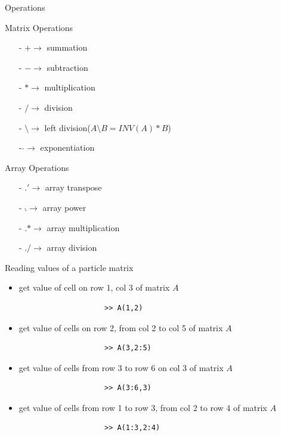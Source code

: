 \documentclass{beamer}
\begin{document}
\begin{frame}{Operations}
	\begin{block}{Matrix Operations}
		\begin{itemize}
			\item [-] $+ \rightarrow $ summation 
			\item [-] $- \rightarrow $ subtraction
			\item [-] $* \rightarrow $ multiplication
			\item [-] $/ \rightarrow $ division  
			\item [-] $\setminus \rightarrow $ left division($ A\setminus B = INV(A) * B$)
			\item [-] $\hat{} \rightarrow $ exponentiation  
		\end{itemize}
	\end{block}
	\begin{block}{Array Operations}
		\begin{itemize}
			\item [-] $.' \rightarrow $ array transpose
			\item [-] $.\hat{} \rightarrow $ array power
			\item [-] $.* \rightarrow $ array multiplication
			\item [-] $./ \rightarrow $ array division  
		\end{itemize}
	\end{block}
\end{frame}

\begin{frame}[fragile]{Reading values of a particle matrix}
	\begin{block}{}
		\begin{itemize}
			\item get value of cell on row 1, col 3 of matrix $A$
			\java
				\begin{lstlisting}
					>> A(1,2)
				\end{lstlisting}
			\item get value of cells on row 2, from col 2 to col 5 of matrix $A$
			\java
				\begin{lstlisting}
					>> A(3,2:5)
				\end{lstlisting}
			\item get value of cells from row 3 to row 6 on col 3 of matrix $A$
			\java
				\begin{lstlisting}
					>> A(3:6,3)
				\end{lstlisting}
			\item get value of cells from row 1 to row 3, from col 2 to row 4 of matrix $A$
			\java
				\begin{lstlisting}
					>> A(1:3,2:4)
				\end{lstlisting}
		\end{itemize}
	\end{block}
\end{frame}
\end{document}
